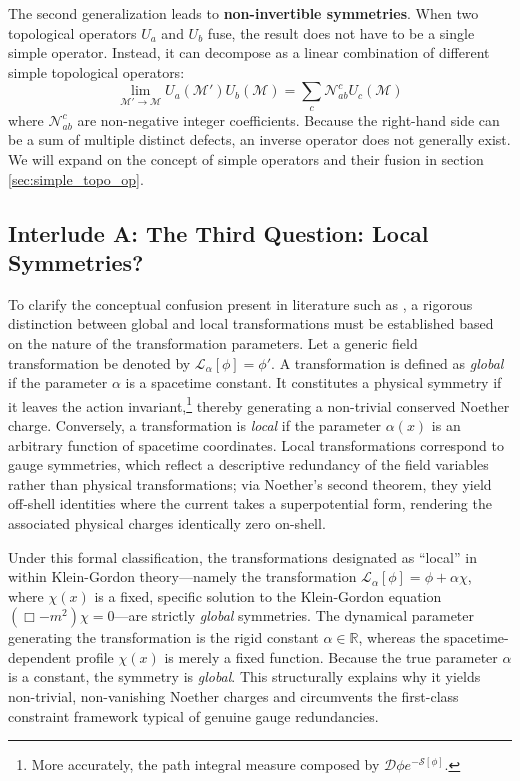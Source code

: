 \documentclass[aps,preprint,nofootinbib,preprintnumbers,eqsecnum,superscriptaddress]{revtex4}
\numberwithin{equation}{section}
\begin{document}
The second generalization leads to \textbf{non-invertible symmetries}. When two topological operators $U_a$ and $U_b$ fuse, the result does not have to be a single simple operator. Instead, it can decompose as a linear combination of different simple topological operators:
\begin{equation}
    \lim_{\mathcal{M'}\to\mathcal{M}} U_{a}(\mathcal{M'}) U_{b}(\mathcal{M}) = \sum_c \mathcal{N}^c_{ab} U_{c}(\mathcal{M})
    \label{eq:fusion_non_inv}
\end{equation}
where $\mathcal{N}^c_{ab}$ are non-negative integer coefficients. Because the right-hand side can be a sum of multiple distinct defects, an inverse operator does not generally exist. We will expand on the concept of simple operators and their fusion in section \ref{sec:simple_topo_op}.

\subsection{Interlude A: The Third Question: Local Symmetries?}\label{section:local_symmetry}

To clarify the conceptual confusion present in literature such as \cite{Barcel__2016}, a rigorous distinction between global and local transformations must be established based on the nature of the transformation parameters. Let a generic field transformation be denoted by $\mathcal{L}_\alpha[\phi] = \phi'$. A transformation is defined as \textit{global} if the parameter $\alpha$ is a spacetime constant. It constitutes a physical symmetry if it leaves the action invariant,\footnote{More accurately, the path integral measure composed by $\mathcal{D}\phi e^{-\mathcal{S}[\phi]}$.} thereby generating a non-trivial conserved Noether charge. Conversely, a transformation is \textit{local} if the parameter $\alpha(x)$ is an arbitrary function of spacetime coordinates. Local transformations correspond to gauge symmetries, which reflect a descriptive redundancy of the field variables rather than physical transformations; via Noether's second theorem, they yield off-shell identities where the current takes a superpotential form, rendering the associated physical charges identically zero on-shell.

Under this formal classification, the transformations designated as ``local'' in \cite{Barcel__2016} within Klein-Gordon theory—namely the transformation $\mathcal{L}_\alpha [\phi] = \phi + \alpha \chi$, where $\chi(x)$ is a fixed, specific solution to the Klein-Gordon equation $(\Box - m^2)\chi = 0$—are strictly \textit{global} symmetries. The dynamical parameter generating the transformation is the rigid constant $\alpha \in \mathbb{R}$, whereas the spacetime-dependent profile $\chi(x)$ is merely a fixed function. Because the true parameter $\alpha$ is a constant, the symmetry is \textit{global}. This structurally explains why it yields non-trivial, non-vanishing Noether charges and circumvents the first-class constraint framework typical of genuine gauge redundancies.
\end{document}
